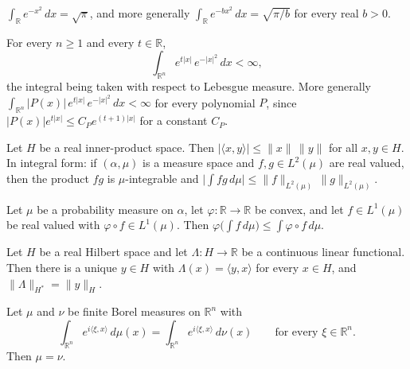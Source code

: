 \begin{proposition}
$\int_{\mathbb{R}} e^{-x^2}\, dx = \sqrt{\pi}$, and more generally
$\int_{\mathbb{R}} e^{-b x^2}\, dx = \sqrt{\pi/b}$ for every real $b > 0$.
\end{proposition}
\begin{proposition}
For every $n \geq 1$ and every $t \in \mathbb{R}$,
\[
  \int_{\mathbb{R}^n} e^{t|x|}\, e^{-|x|^2}\, dx < \infty ,
\]
the integral being taken with respect to Lebesgue measure.  More generally
$\int_{\mathbb{R}^n} |P(x)|\, e^{t|x|}\, e^{-|x|^2}\, dx < \infty$ for every
polynomial $P$, since $|P(x)|e^{t|x|} \leq C_P e^{(t+1)|x|}$ for a constant
$C_P$.
\end{proposition}
\begin{proposition}
Let $H$ be a real inner-product space.  Then
$|\langle x, y\rangle| \leq \|x\|\,\|y\|$ for all $x,y \in H$.  In integral
form: if $(\alpha,\mu)$ is a measure space and $f, g \in L^2(\mu)$ are real
valued, then the product $fg$ is $\mu$-integrable and
$\bigl|\int fg \, d\mu\bigr| \leq \|f\|_{L^2(\mu)}\,\|g\|_{L^2(\mu)}$.
\end{proposition}
\begin{proposition}
Let $\mu$ be a probability measure on $\alpha$, let $\varphi : \mathbb{R} \to
\mathbb{R}$ be convex, and let $f \in L^1(\mu)$ be real valued with
$\varphi \circ f \in L^1(\mu)$.  Then
$\varphi\bigl(\int f \, d\mu\bigr) \leq \int \varphi \circ f \, d\mu$.
\end{proposition}
\begin{proposition}
Let $H$ be a real Hilbert space and let $\Lambda : H \to \mathbb{R}$ be a
continuous linear functional.  Then there is a unique $y \in H$ with
$\Lambda(x) = \langle y, x\rangle$ for every $x \in H$, and
$\|\Lambda\|_{H^*} = \|y\|_H$.
\end{proposition}
\begin{proposition}
Let $\mu$ and $\nu$ be finite Borel measures on $\mathbb{R}^n$ with
\[
  \int_{\mathbb{R}^n} e^{i\langle \xi, x\rangle}\, d\mu(x)
    = \int_{\mathbb{R}^n} e^{i\langle \xi, x\rangle}\, d\nu(x)
  \qquad\text{for every } \xi \in \mathbb{R}^n .
\]
Then $\mu = \nu$.
\end{proposition}

